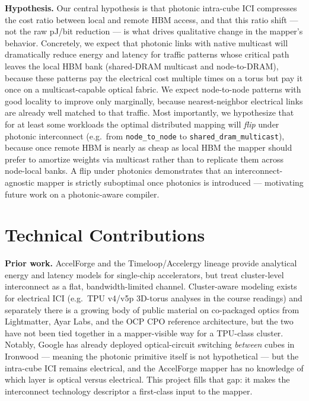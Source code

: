 \documentclass[conference,onecolumn]{IEEEtran}
\begin{document}
\textbf{Hypothesis.}
Our central hypothesis is that photonic intra-cube ICI compresses the cost
ratio between local and remote HBM access, and that this ratio shift
--- not the raw pJ/bit reduction --- is what drives qualitative change in the
mapper's behavior. Concretely, we expect that photonic links with native
multicast will dramatically reduce energy and latency for traffic patterns
whose critical path leaves the local HBM bank (shared-DRAM multicast and
node-to-DRAM), because these patterns pay the electrical cost multiple times
on a torus but pay it once on a multicast-capable optical fabric. We expect
node-to-node patterns with good locality to improve only marginally, because
nearest-neighbor electrical links are already well matched to that traffic.
Most importantly, we hypothesize that for at least some workloads the optimal
distributed mapping will \emph{flip} under photonic interconnect
(e.g.\ from \texttt{node\_to\_node} to \texttt{shared\_dram\_multicast}),
because once remote HBM is nearly as cheap as local HBM the mapper should
prefer to amortize weights via multicast rather than to replicate them across
node-local banks. A flip under photonics demonstrates that an
interconnect-agnostic mapper is strictly suboptimal once photonics is
introduced --- motivating future work on a photonic-aware compiler.


\section{Technical Contributions}
\textbf{Prior work.}
AccelForge and the Timeloop/Accelergy lineage provide analytical energy and
latency models for single-chip accelerators, but treat cluster-level
interconnect as a flat, bandwidth-limited channel. Cluster-aware modeling
exists for electrical ICI (e.g.\ TPU v4/v5p 3D-torus analyses in the course
readings) and separately there is a growing body of public material on
co-packaged optics from Lightmatter, Ayar Labs, and the OCP CPO reference
architecture, but the two have not been tied together in a mapper-visible way
for a TPU-class cluster. Notably, Google has already deployed optical-circuit
switching \emph{between} cubes in Ironwood --- meaning the photonic primitive
itself is not hypothetical --- but the intra-cube ICI remains electrical, and
the AccelForge mapper has no knowledge of which layer is optical versus
electrical. This project fills that gap: it makes the interconnect technology
descriptor a first-class input to the mapper.
\end{document}
